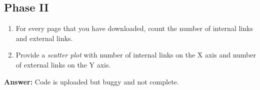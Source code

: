 \documentclass{WeSTassignment}
\begin{document}
\subsection{Phase II}
\begin{enumerate}
\item For every page that you have downloaded, count the number of internal links and external links. 
\item Provide a \emph{scatter plot} with number of internal links on the X axis and number of external links on the Y axis.
\end{enumerate}


\textbf{Answer:} Code is uploaded but buggy and not complete.





\makefooter
\end{document}
